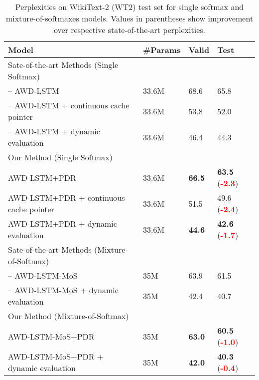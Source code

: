 \documentclass{article} \usepackage{iclr2019_conference,times}
\begin{document}
\begin{table}[t]
\begin{tabular}{llll}
\toprule
\textbf{Model} & \textbf{\#Params} & \textbf{Valid} & \textbf{Test} \\
\midrule
Sate-of-the-art Methods (Single Softmax) \\
\midrule
\cite{Merity2018} -- AWD-LSTM  & 33.6M &  68.6  & 65.8 \\
\cite{Merity2018} -- AWD-LSTM + continuous cache pointer & 33.6M &  53.8 & 52.0\\
\cite{Krause2018DynamicEO} -- AWD-LSTM + dynamic evaluation & 33.6M & 46.4 & 44.3 \\
\midrule
Our Method (Single Softmax) \\
\midrule
AWD-LSTM+PDR & 33.6M & \textbf{66.5} & \textbf{63.5}  (\textcolor{red}{\textbf{-2.3}}) \\
AWD-LSTM+PDR + continuous cache pointer & 33.6M & {51.5} & {49.6}  (\textcolor{red}{\textbf{-2.4}})\\
AWD-LSTM+PDR + dynamic evaluation & 33.6M &  \textbf{44.6} & \textbf{42.6}  (\textcolor{red}{\textbf{-1.7}})\\
\midrule
Sate-of-the-art Methods (Mixture-of-Softmax)\\
\midrule
\cite{Yang2017BreakingTS} -- AWD-LSTM-MoS  & 35M &  63.9  & 61.5 \\
\cite{Yang2017BreakingTS} -- AWD-LSTM-MoS + dynamic evaluation & 35M &  42.4 & 40.7\\
\midrule
Our Method (Mixture-of-Softmax)\\
\midrule
AWD-LSTM-MoS+PDR  & 35M & \textbf{63.0} & \textbf{60.5}  (\textcolor{red}{\textbf{-1.0}})\\
AWD-LSTM-MoS+PDR + dynamic evaluation & 35M & \textbf{42.0} & \textbf{40.3}  (\textcolor{red}{\textbf{-0.4}})\\
\toprule
\end{tabular}
\caption{Perplexities on WikiText-2 (WT2) test set for single softmax and mixture-of-softmaxes models. Values in parentheses show improvement over respective state-of-the-art perplexities.}
\label{tab:wt2_res}
\vspace{-1em}
\end{table}
\end{document}
